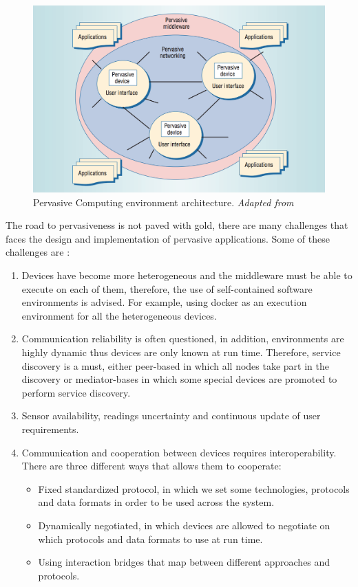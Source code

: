 \begin{figure}[H]
	\centering
	\includegraphics[scale=0.7]{images/pervasive-computing.png}
	\caption{Pervasive Computing environment architecture. \textit{Adapted from \cite{Saha:2003:PCP:642243.642248}}}
 	\label{fig:pervaisive-computing}
\end{figure}

\noindent The road to pervasiveness is not paved with gold, there are many challenges that faces the design and implementation of pervasive applications. Some of these challenges are \cite{Schiele2010}:
\begin{enumerate}
\item Devices have become more heterogeneous and the middleware must be able to execute on each of them, therefore, the use of self-contained software environments is advised. For example, using docker as an execution environment for all the heterogeneous devices.
\item Communication reliability is often questioned, in addition,  environments are highly dynamic thus devices are only known at run time.   Therefore, service discovery is a must, either peer-based in which all nodes  take part in the discovery or mediator-bases in which some special devices are promoted to perform service discovery.
\item Sensor availability, readings uncertainty and continuous update of user requirements.
\item Communication and cooperation between devices requires interoperability. There are three different ways that allows them to cooperate:

\begin{itemize}
\item Fixed standardized protocol, in which we set some technologies, protocols and data formats in order to be used across the system.
\item Dynamically negotiated, in which devices are allowed to negotiate on which protocols and data formats to use  at run time.
\item Using interaction bridges that map between different approaches and protocols.
\end{itemize}

\end{enumerate} 



